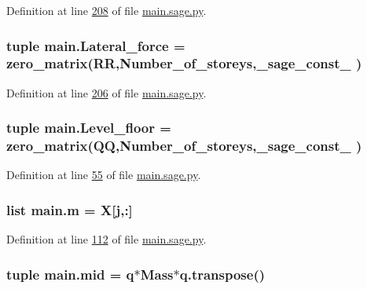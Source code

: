Definition at line \hyperlink{main_8sage_8py_source_l00208}{208} of file \hyperlink{main_8sage_8py_source}{main.\+sage.\+py}.

\hypertarget{namespacemain_a712447a841ce148ad2d1210e57dc7894}{}
\subsubsection[{Lateral\+\_\+force}]{\setlength{\rightskip}{0pt plus 5cm}tuple main.\+Lateral\+\_\+force = zero\+\_\+matrix(R\+R,Number\+\_\+of\+\_\+storeys,\+\_\+sage\+\_\+const\+\_ )}\label{namespacemain_a712447a841ce148ad2d1210e57dc7894}


Definition at line \hyperlink{main_8sage_8py_source_l00206}{206} of file \hyperlink{main_8sage_8py_source}{main.\+sage.\+py}.

\hypertarget{namespacemain_ad7b051da0e829aff37fef1e171e37fa3}{}
\subsubsection[{Level\+\_\+floor}]{\setlength{\rightskip}{0pt plus 5cm}tuple main.\+Level\+\_\+floor = zero\+\_\+matrix(Q\+Q,Number\+\_\+of\+\_\+storeys,\+\_\+sage\+\_\+const\+\_ )}\label{namespacemain_ad7b051da0e829aff37fef1e171e37fa3}


Definition at line \hyperlink{main_8sage_8py_source_l00055}{55} of file \hyperlink{main_8sage_8py_source}{main.\+sage.\+py}.

\hypertarget{namespacemain_af6e3698b7f50fc004eb759d7c447fdb3}{}
\subsubsection[{m}]{\setlength{\rightskip}{0pt plus 5cm}list main.\+m = {\bf X}\mbox{[}{\bf j},\+:\mbox{]}}\label{namespacemain_af6e3698b7f50fc004eb759d7c447fdb3}


Definition at line \hyperlink{main_8sage_8py_source_l00112}{112} of file \hyperlink{main_8sage_8py_source}{main.\+sage.\+py}.

\hypertarget{namespacemain_a70551c7fc78da8fdec83fe500056d388}{}
\subsubsection[{mid}]{\setlength{\rightskip}{0pt plus 5cm}tuple main.\+mid = {\bf q}$\ast$Mass$\ast$q.\+transpose()}\label{namespacemain_a70551c7fc78da8fdec83fe500056d388}


